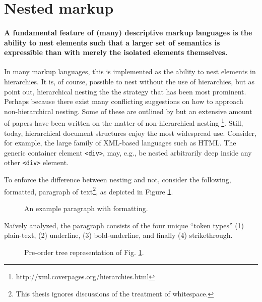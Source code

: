 \documentclass{scrreprt}
\begin{document}
\section{Nested markup}
\label{sec:nesting}
\paragraph{A fundamental feature of (many) descriptive markup languages is the ability to nest elements such that a larger set of semantics is expressible than with merely the isolated elements themselves.} In many markup languages, this is implemented as the ability to nest elements in hierarchies. It is, of course, possible to nest without the use of hierarchies, but as \citet*{durand} point out, hierarchical nesting the the strategy that has been most prominent. Perhaps because there exist many conflicting suggestions on how to approach non-hierarchical nesting. Some of these are outlined by \citet{durand} but an extensive amount of papers have been written on the matter of non-hierarchical nesting \footnote{http://xml.coverpages.org/hierarchies.html}. Still, today, hierarchical document structures enjoy the most widespread use. Consider, for example, the large family of XML-based languages such as HTML. The generic container element \texttt{<div>}, may, e.g., be nested arbitrarily deep inside any other \texttt{<div>} element.



To enforce the difference between nesting and not, consider the following, formatted, paragraph of text\footnote{This thesis ignores discussions of the treatment of whitespace.}, as depicted in Figure \ref{fig:mixed-content-paragraph}.


\begin{figure}[h]
\centering
{}
\caption{An example paragraph with formatting.}
\label{fig:mixed-content-paragraph}
\end{figure}


Naïvely analyzed, the paragraph consists of the four unique ``token types'' (1) plain-text, (2) underline, (3) bold-underline, and finally (4) strikethrough.





\begin{figure}[h]
  \centering

  \caption{Pre-order tree representation of Fig. \ref{fig:mixed-content-paragraph}.}
  \label{fig:mixed-content-flat-tree}
\end{figure}
\end{document}
